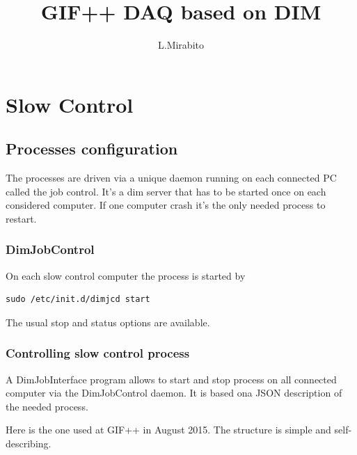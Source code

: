 \documentclass[english]{article}
\title{\textbf{GIF++ DAQ based on DIM}}
\author{L.Mirabito}
\date{}
\begin{document}
\maketitle
\section{Slow Control}
\subsection{Processes configuration}
The processes are driven via a unique daemon running on each connected PC called the job control. It's a dim server that has to be started once on each considered computer. If one computer crash it's the only needed process to restart.
\subsubsection{DimJobControl}

On each slow control computer the process is started by
\begin{verbatim}
sudo /etc/init.d/dimjcd start
\end{verbatim}
The usual stop and status options are available.

\subsubsection{Controlling slow control process}

A DimJobInterface program allows to start and stop process on all connected computer via the DimJobControl daemon. It is based ona JSON description of the needed process.

Here is the one used at GIF++ in August 2015. The structure is simple and self-describing.
\end{document}
